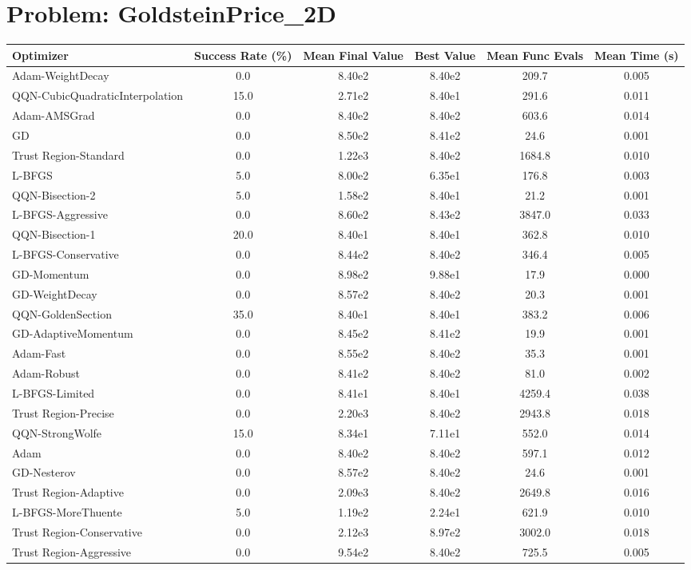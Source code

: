 \documentclass{article}
\begin{document}
\section{Problem: GoldsteinPrice\_2D}
\begin{longtable}{p{3cm}*{5}{c}}
\toprule
\textbf{Optimizer} & \textbf{Success Rate (\%)} & \textbf{Mean Final Value} & \textbf{Best Value} & \textbf{Mean Func Evals} & \textbf{Mean Time (s)} \\
\midrule
Adam-WeightDecay & 0.0 & 8.40e2 & 8.40e2 & 209.7 & 0.005 \\
QQN-CubicQuadraticInterpolation & 15.0 & 2.71e2 & 8.40e1 & 291.6 & 0.011 \\
Adam-AMSGrad & 0.0 & 8.40e2 & 8.40e2 & 603.6 & 0.014 \\
GD & 0.0 & 8.50e2 & 8.41e2 & 24.6 & 0.001 \\
Trust Region-Standard & 0.0 & 1.22e3 & 8.40e2 & 1684.8 & 0.010 \\
L-BFGS & 5.0 & 8.00e2 & 6.35e1 & 176.8 & 0.003 \\
QQN-Bisection-2 & 5.0 & 1.58e2 & 8.40e1 & 21.2 & 0.001 \\
L-BFGS-Aggressive & 0.0 & 8.60e2 & 8.43e2 & 3847.0 & 0.033 \\
QQN-Bisection-1 & 20.0 & 8.40e1 & 8.40e1 & 362.8 & 0.010 \\
L-BFGS-Conservative & 0.0 & 8.44e2 & 8.40e2 & 346.4 & 0.005 \\
GD-Momentum & 0.0 & 8.98e2 & 9.88e1 & 17.9 & 0.000 \\
GD-WeightDecay & 0.0 & 8.57e2 & 8.40e2 & 20.3 & 0.001 \\
QQN-GoldenSection & 35.0 & 8.40e1 & 8.40e1 & 383.2 & 0.006 \\
GD-AdaptiveMomentum & 0.0 & 8.45e2 & 8.41e2 & 19.9 & 0.001 \\
Adam-Fast & 0.0 & 8.55e2 & 8.40e2 & 35.3 & 0.001 \\
Adam-Robust & 0.0 & 8.41e2 & 8.40e2 & 81.0 & 0.002 \\
L-BFGS-Limited & 0.0 & 8.41e1 & 8.40e1 & 4259.4 & 0.038 \\
Trust Region-Precise & 0.0 & 2.20e3 & 8.40e2 & 2943.8 & 0.018 \\
QQN-StrongWolfe & 15.0 & 8.34e1 & 7.11e1 & 552.0 & 0.014 \\
Adam & 0.0 & 8.40e2 & 8.40e2 & 597.1 & 0.012 \\
GD-Nesterov & 0.0 & 8.57e2 & 8.40e2 & 24.6 & 0.001 \\
Trust Region-Adaptive & 0.0 & 2.09e3 & 8.40e2 & 2649.8 & 0.016 \\
L-BFGS-MoreThuente & 5.0 & 1.19e2 & 2.24e1 & 621.9 & 0.010 \\
Trust Region-Conservative & 0.0 & 2.12e3 & 8.97e2 & 3002.0 & 0.018 \\
Trust Region-Aggressive & 0.0 & 9.54e2 & 8.40e2 & 725.5 & 0.005 \\
\bottomrule
\end{longtable}
\end{document}
